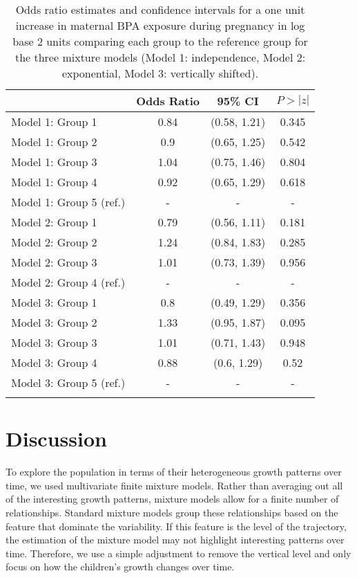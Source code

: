 \begin{table}[ht]
\centering 
\begin{tabular}{lccc}
  \thickhline
 & Odds Ratio & 95\% CI & $P>|z|$ \\ 
  \hline
Model 1: Group  1 & 0.84 & (0.58, 1.21) & 0.345 \\ 
  Model 1: Group  2 & 0.9 & (0.65, 1.25) & 0.542 \\ 
  Model 1: Group  3 & 1.04 & (0.75, 1.46) & 0.804 \\ 
  Model 1: Group  4 & 0.92 & (0.65, 1.29) & 0.618 \\ 
  Model 1: Group  5  (ref.) & - & - & - \\ 
  Model 2: Group  1 & 0.79 & (0.56, 1.11) & 0.181 \\ 
  Model 2: Group  2 & 1.24 & (0.84, 1.83) & 0.285 \\ 
  Model 2: Group  3 & 1.01 & (0.73, 1.39) & 0.956 \\ 
  Model 2: Group  4  (ref.) & - & - & - \\ 
  Model 3: Group  1 & 0.8 & (0.49, 1.29) & 0.356 \\ 
  Model 3: Group  2 & 1.33 & (0.95, 1.87) & 0.095 \\ 
  Model 3: Group  3 & 1.01 & (0.71, 1.43) & 0.948 \\ 
  Model 3: Group  4 & 0.88 & (0.6, 1.29) & 0.52 \\ 
  Model 3: Group  5  (ref.) & - & - & - \\ 
   \thickhline
\end{tabular}
\caption{Odds ratio estimates and confidence intervals for a one unit increase in maternal BPA exposure during pregnancy in log base 2 units comparing each group to the reference group for the three mixture models (Model 1: independence, Model 2: exponential, Model 3: vertically shifted). }
\label{tab:6-2}
\end{table}

\section{Discussion}
To explore the population in terms of their heterogeneous growth patterns over time, we used multivariate finite mixture models. Rather than averaging out all of the interesting growth patterns, mixture models allow for a finite number of relationships. Standard mixture models group these relationships based on the feature that dominate the variability. If this feature is the level of the trajectory, the estimation of the mixture model may not highlight interesting patterns over time. Therefore, we use a simple adjustment to remove the vertical level and only focus on how the children's growth changes over time.

